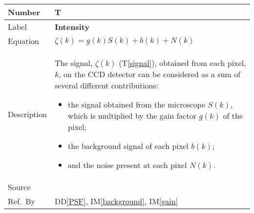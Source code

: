 \documentclass[12pt]{article}
\newcommand{\colAwidth}{0.13\textwidth}
\newcommand{\colBwidth}{0.82\textwidth}
\newcommand{\ddref}[1]{DD\ref{#1}}
\newcounter{theorynum} %
\newcommand{\tref}[1]{T\ref{#1}}
\newcommand{\iref}[1]{IM\ref{#1}}
\begin{document}
\noindent
\begin{minipage}{\textwidth}
	\renewcommand*{\arraystretch}{1.5}
	\begin{tabular}{| p{\colAwidth} | p{\colBwidth}|}
		  \hline
		  \rowcolor[gray]{0.9}
		  Number& T{theorynum}\thetheorynum \label{intensity}\\
		  \hline
		  Label&\bf Intensity \\
		  \hline
		  Equation& $\zeta(k) = g(k) S(k) + b(k) + N(k)$ \\
		  \hline
		  Description & The signal, $\zeta(k)$ (\tref{signal}), obtained from each
pixel, $k$, on the CCD detector can be considered as a sum of several different
contributions: 
		  \begin{itemize}
			\item the signal obtained from the microscope $S(k)$, which is multiplied by
the gain factor $g(k)$ of the pixel; 
			\item the background signal of each pixel $b(k)$; 
			\item and the noise present at each pixel $N(k)$.
		  \end{itemize}\\
		  \hline
		  Source & \cite{zuo_electron_2000}\\
		  \hline
		  Ref.\ By & \ddref{PSF}, \iref{background}, \iref{gain} \\
		  \hline
	\end{tabular}
\end{minipage}\\

~\newline
\end{document}

